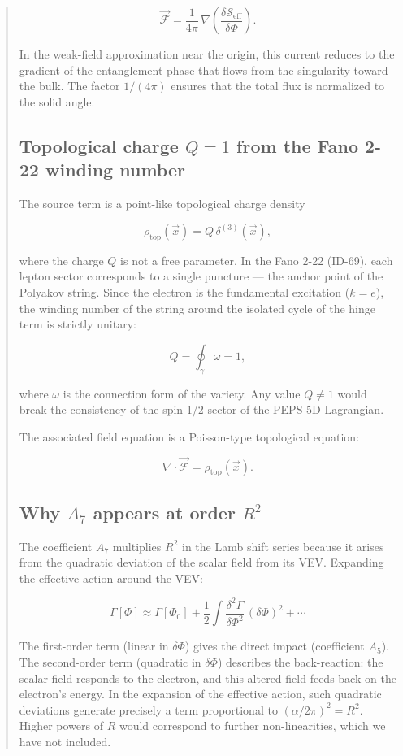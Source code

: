 \documentclass[12pt]{article}
\begin{document}
\begin{abstract}
\[
\boxed{\vec{\mathcal{F}} = \frac{1}{4\pi}\,\nabla\left( \frac{\delta\mathcal{S}_{\text{eff}}}{\delta\Phi} \right)} .
\]

In the weak-field approximation near the origin, this current reduces to the gradient of the entanglement phase that flows from the singularity toward the bulk. The factor \(1/(4\pi)\) ensures that the total flux is normalized to the solid angle.

\subsection{Topological charge \(Q=1\) from the Fano 2-22 winding number}

The source term is a point-like topological charge density

\[
\rho_{\text{top}}(\vec{x}) = Q\,\delta^{(3)}(\vec{x}),
\]

where the charge \(Q\) is not a free parameter. In the Fano 2-22 (ID-69), each lepton sector corresponds to a single puncture — the anchor point of the Polyakov string. Since the electron is the fundamental excitation (\(k=e\)), the winding number of the string around the isolated cycle of the hinge term is strictly unitary:

\[
\boxed{Q = \oint_{\gamma} \omega = 1},
\]

where \(\omega\) is the connection form of the variety. Any value \(Q \neq 1\) would break the consistency of the spin-1/2 sector of the PEPS-5D Lagrangian.

The associated field equation is a Poisson-type topological equation:

\[
\nabla \cdot \vec{\mathcal{F}} = \rho_{\text{top}}(\vec{x}) .
\]

\subsection{Why \(A_7\) appears at order \(R^2\)}

The coefficient \(A_7\) multiplies \(R^2\) in the Lamb shift series because it arises from the quadratic deviation of the scalar field from its VEV. Expanding the effective action around the VEV:

\[
\Gamma[\Phi] \approx \Gamma[\Phi_0] + \frac{1}{2} \int \frac{\delta^2 \Gamma}{\delta\Phi^2}\, (\delta\Phi)^2 + \cdots
\]

The first-order term (linear in \(\delta\Phi\)) gives the direct impact (coefficient \(A_5\)). The second-order term (quadratic in \(\delta\Phi\)) describes the back-reaction: the scalar field responds to the electron, and this altered field feeds back on the electron's energy. In the expansion of the effective action, such quadratic deviations generate precisely a term proportional to \((\alpha/2\pi)^2 = R^2\). Higher powers of \(R\) would correspond to further non-linearities, which we have not included.


\end{abstract}
\end{document}
